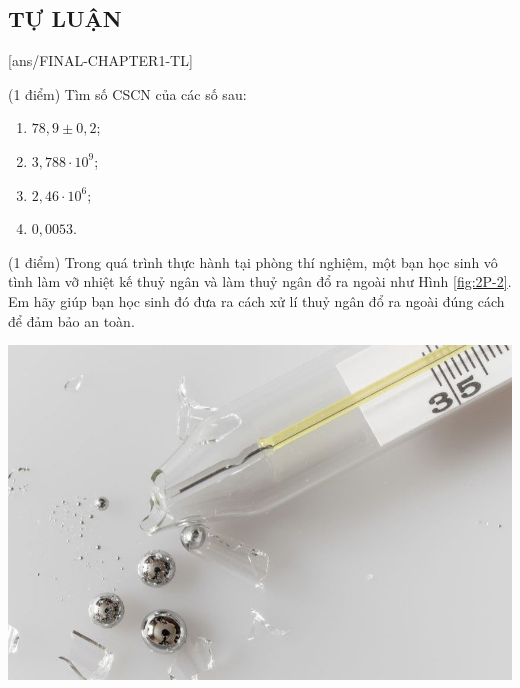 \subsection{TỰ LUẬN}
\setcounter{ex}{0}
[ans/FINAL-CHAPTER1-TL]
\begin{ex}
	(1 điểm) Tìm số CSCN của các số sau:
	\begin{enumerate}[label=\alph*)]
		\item $78,9\pm 0,2$;
		\item $3,788\cdot10^9$;
		\item $2,46\cdot10^6$;
		\item $0,0053$.
	\end{enumerate}
\end{ex}

\begin{ex}
	(1 điểm) Trong quá trình thực hành tại phòng thí nghiệm, một bạn học sinh vô tình làm vỡ nhiệt kế thuỷ ngân và làm thuỷ ngân đổ ra ngoài như Hình \ref{fig:2P-2}. Em hãy giúp bạn học sinh đó đưa ra cách xử lí thuỷ ngân đổ ra ngoài đúng cách để đảm bảo an toàn.
	\begin{center}
		\includegraphics[width=0.3\linewidth]{figs/FINAL-CHAPTER1-2}
		\label{fig:2P-2}
	\end{center}
\end{ex}


